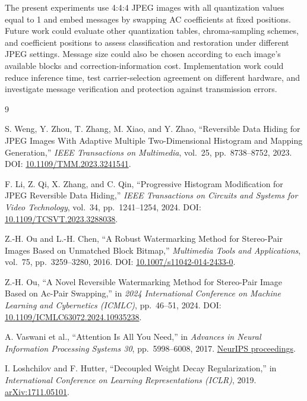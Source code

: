\documentclass[
  11pt,
  a4paper,
]{article}
\begin{document}
The present experiments use 4:4:4 JPEG images with all quantization
values equal to 1 and embed messages by swapping AC coefficients at
fixed positions. Future work could evaluate other quantization tables,
chroma-sampling schemes, and coefficient positions to assess
classification and restoration under different JPEG settings. Message
size could also be chosen according to each image's available blocks and
correction-information cost. Implementation work could reduce inference
time, test carrier-selection agreement on different hardware, and
investigate message verification and protection against transmission
errors.

\begin{thebibliography}{9}

 S. Weng, Y. Zhou, T. Zhang, M. Xiao, and Y. Zhao, ``Reversible
Data Hiding for JPEG Images With Adaptive Multiple Two-Dimensional
Histogram and Mapping Generation,'' \emph{IEEE Transactions on
Multimedia}, vol.~25, pp.~8738--8752, 2023. DOI:
\href{https://doi.org/10.1109/TMM.2023.3241541}{10.1109/TMM.2023.3241541}.

 F. Li, Z. Qi, X. Zhang, and C. Qin, ``Progressive Histogram
Modification for JPEG Reversible Data Hiding,'' \emph{IEEE Transactions
on Circuits and Systems for Video Technology}, vol.~34, pp.~1241--1254,
2024. DOI:
\href{https://doi.org/10.1109/TCSVT.2023.3288038}{10.1109/TCSVT.2023.3288038}.

 Z.-H. Ou and L.-H. Chen, ``A Robust Watermarking Method for
Stereo-Pair Images Based on Unmatched Block Bitmap,'' \emph{Multimedia
Tools and Applications}, vol.~75, pp.~3259--3280, 2016. DOI:
\href{https://doi.org/10.1007/s11042-014-2433-0}{10.1007/s11042-014-2433-0}.

 Z.-H. Ou, ``A Novel Reversible Watermarking Method for
Stereo-Pair Image Based on Ac-Pair Swapping,'' in \emph{2024
International Conference on Machine Learning and Cybernetics (ICMLC)},
pp.~46--51, 2024. DOI:
\href{https://doi.org/10.1109/ICMLC63072.2024.10935238}{10.1109/ICMLC63072.2024.10935238}.

 A. Vaswani et al., ``Attention Is All You Need,'' in
\emph{Advances in Neural Information Processing Systems 30},
pp.~5998--6008, 2017.
\href{https://papers.nips.cc/paper/7181-attention-is-all-you-need}{NeurIPS
proceedings}.

 I. Loshchilov and F. Hutter, ``Decoupled Weight Decay
Regularization,'' in \emph{International Conference on Learning
Representations (ICLR)}, 2019.
\href{https://arxiv.org/abs/1711.05101}{arXiv:1711.05101}.


\end{thebibliography}
\end{document}

